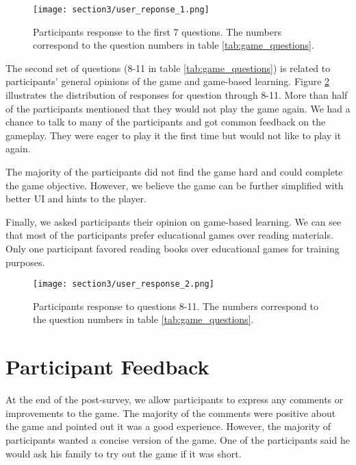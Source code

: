 \begin{figure}[!ht]
    \centering
    \texttt{[image: section3/user\_reponse\_1.png]}
    \caption[Responses to the first 7 questions]{Participants response to the first 7 questions. The numbers correspond to the question numbers in table \ref{tab:game_questions}.}
    \label{fig:phishing_game_questions_1}
\end{figure}

The second set of questions (8-11 in table \ref{tab:game_questions}) is related to participants' general opinions of the game and game-based learning. Figure \ref{fig:phishing_game_questions_2} illustrates the distribution of responses for question through 8-11.  More than half of the participants mentioned that they would not play the game again. We had a chance to talk to many of the participants and got common feedback on the gameplay. They were eager to play it the first time but would not like to play it again.

The majority of the participants did not find the game hard and could complete the game objective. However, we believe the game can be further simplified with better UI and hints to the player.

Finally, we asked participants their opinion on game-based learning. We can see that most of the participants prefer educational games over reading materials. Only one participant favored reading books over educational games for training purposes.


\begin{figure}[!ht]
    \centering
    \texttt{[image: section3/user\_response\_2.png]}
    \caption[Responses to the 2nd set of questions]{Participants response to questions 8-11. The numbers correspond to the question numbers in table \ref{tab:game_questions}.}
    \label{fig:phishing_game_questions_2}
\end{figure}


\section{Participant Feedback}
At the end of the post-survey, we allow participants to express any comments or improvements to the game. The majority of the comments were positive about the game and pointed out it was a good experience. However, the majority of participants wanted a concise version of the game. One of the participants said he would ask his family to try out the game if it was short.

